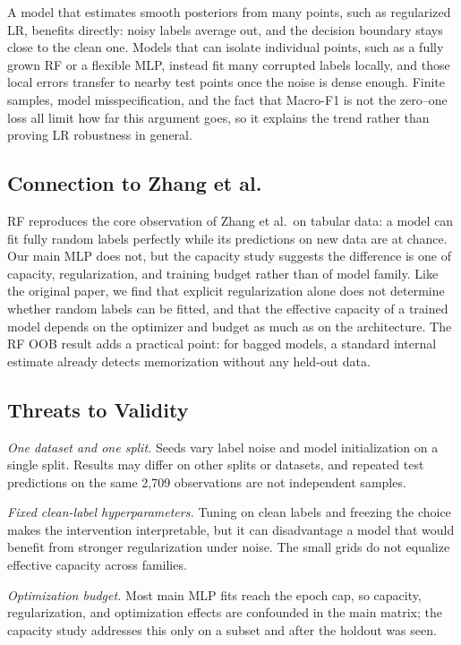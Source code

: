 \documentclass[conference,letterpaper]{IEEEtran}
\begin{document}
A model that estimates smooth posteriors from many points, such as regularized LR, benefits directly: noisy labels average out, and the decision boundary stays close to the clean one. Models that can isolate individual points, such as a fully grown RF or a flexible MLP, instead fit many corrupted labels locally, and those local errors transfer to nearby test points once the noise is dense enough. Finite samples, model misspecification, and the fact that Macro-F1 is not the zero--one loss all limit how far this argument goes, so it explains the trend rather than proving LR robustness in general.

\subsection{Connection to Zhang et al.}
RF reproduces the core observation of Zhang et al.\ on tabular data: a model can fit fully random labels perfectly while its predictions on new data are at chance. Our main MLP does not, but the capacity study suggests the difference is one of capacity, regularization, and training budget rather than of model family. Like the original paper, we find that explicit regularization alone does not determine whether random labels can be fitted, and that the effective capacity of a trained model depends on the optimizer and budget as much as on the architecture. The RF OOB result adds a practical point: for bagged models, a standard internal estimate already detects memorization without any held-out data.

\subsection{Threats to Validity}
\textit{One dataset and one split.} Seeds vary label noise and model initialization on a single split. Results may differ on other splits or datasets, and repeated test predictions on the same 2,709 observations are not independent samples.

\textit{Fixed clean-label hyperparameters.} Tuning on clean labels and freezing the choice makes the intervention interpretable, but it can disadvantage a model that would benefit from stronger regularization under noise. The small grids do not equalize effective capacity across families.

\textit{Optimization budget.} Most main MLP fits reach the epoch cap, so capacity, regularization, and optimization effects are confounded in the main matrix; the capacity study addresses this only on a subset and after the holdout was seen.
\end{document}
